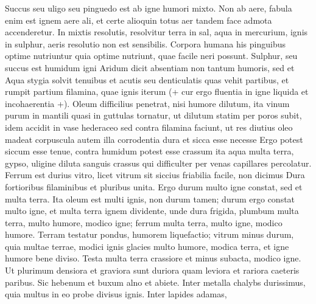 \pstart {} Succus seu uligo seu pinguedo est ab igne humori mixto. Non ab aere, fabula enim est ignem aere ali, et certe alioquin totus aer tandem face admota accenderetur. In mixtis resolutis\protect{}, resolvitur terra in sal, aqua in mercurium, ignis in sulphur, aeris resolutio non est sensibilis. Corpora humana\protect{} his pinguibus optime nutriuntur quia optime nutriunt, quae facile neri possunt. Sulphur, seu succus est humidum igni  Aridum dicit absentiam non tantum humoris, sed et  Aqua stygia solvit tenuibus et acutis seu denticulatis quas vehit partibus, et rumpit partium filamina, quae ignis iterum  (+ cur ergo fluentia in igne liquida et incohaerentia +). Oleum difficilius penetrat, nisi humore dilutum, ita vinum purum in mantili quasi in guttulas tornatur, ut dilutum statim per poros subit, idem accidit in vase hederaceo sed contra filamina faciunt, ut res diutius oleo madeat corpuscula autem illa corrodentia dura et sicca esse necesse  Ergo potest siccum esse tenue, contra humidum potest esse crassum ita aqua multa terra, gypso, uligine diluta sanguis crassus qui difficulter per venas capillares percolatur. Ferrum est durius vitro, licet vitrum sit siccius friabilia facile, non dicimus  Dura fortioribus filaminibus et pluribus unita. Ergo durum multo igne constat, sed et multa terra. Ita oleum est multi ignis, non durum tamen; durum ergo constat multo igne, et multa terra ignem dividente, unde dura frigida, plumbum\protect{} multa terra, multo humore, modico igne; ferrum\protect{} multa terra, multo igne, modico humore. Terram testatur pondus, humorem liquefactio; vitrum minus durum, quia multae terrae, modici ignis glacies multo humore, modica terra, et igne humore bene diviso. Testa multa terra crassiore et minus subacta, modico igne. Ut plurimum densiora et graviora sunt duriora quam leviora et rariora caeteris paribus. Sic hebenum et buxum alno et abiete. Inter metalla chalybs\protect{} durissimus, quia multus in eo probe divisus ignis. Inter lapides adamas\protect{},
